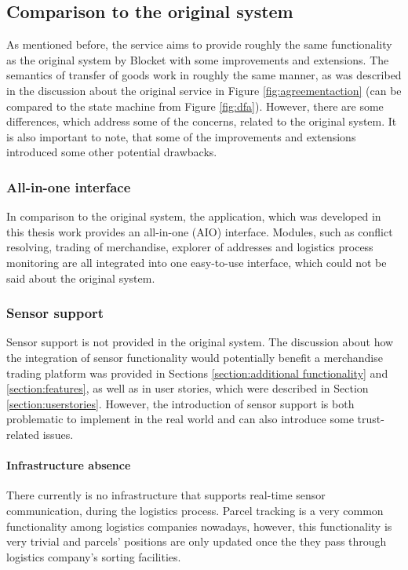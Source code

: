 \subsection{Comparison to the original system} \label{section:comparisontooriginal}

As mentioned before, the service aims to provide roughly the same functionality as the original system by Blocket with some improvements and extensions. The semantics of transfer of goods work in roughly the same manner, as was described in the discussion about the original service in Figure \ref{fig:agreementaction} (can be compared to the state machine from Figure \ref{fig:dfa}). However, there are some differences, which address some of the concerns, related to the original system. It is also important to note, that some of the improvements and extensions introduced some other potential drawbacks.

\subsubsection{All-in-one interface}
In comparison to the original system, the application, which was developed in this thesis work provides an all-in-one (AIO) interface. Modules, such as conflict resolving, trading of merchandise, explorer of addresses and logistics process monitoring are all integrated into one easy-to-use interface, which could not be said about the original system.

\subsubsection{Sensor support} \label{section:sensorsupported}
Sensor support is not provided in the original system. The discussion about how the integration of sensor functionality would potentially benefit a merchandise trading platform was provided in Sections \ref{section:additional functionality} and \ref{section:features}, as well as in user stories, which were described in Section \ref{section:userstories}. However, the introduction of sensor support is both problematic to implement in the real world and can also introduce some trust-related issues.

\paragraph{Infrastructure absence}
There currently is no infrastructure that supports real-time sensor communication, during the logistics process. Parcel tracking is a very common functionality among logistics companies nowadays, however, this functionality is very trivial and parcels' positions are only updated once the they pass through logistics company's sorting facilities. 

